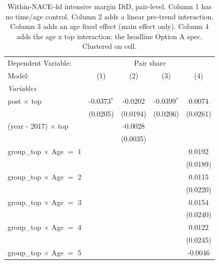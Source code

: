 
\begin{table}[htbp]
   \caption{\label{tab:phase4_within_intensive_did_agecontrol} Within-NACE-4d intensive margin DiD, pair-level. Column 1 has no time/age control. Column 2 adds a linear pre-trend interaction. Column 3 adds an age fixed effect (main effect only). Column 4 adds the age x top interaction: the headline Option A spec. Clustered on cell.}
   \centering
   \begin{tabular}{lcccc}
      \tabularnewline \midrule \midrule
      Dependent Variable: & \multicolumn{4}{c}{Pair share}\\
      Model:                           & (1)           & (2)      & (3)           & (4)\\  
      \midrule
      \emph{Variables}\\
      post $\times$ top                & -0.0373$^{*}$ & -0.0202  & -0.0399$^{*}$ & 0.0074\\   
                                       & (0.0205)      & (0.0194) & (0.0206)      & (0.0261)\\   
      (year - 2017) $\times$ top       &               & -0.0028  &               &   \\   
                                       &               & (0.0035) &               &   \\   
      group\_top $\times$ Age $=$ 1    &               &          &               & 0.0192\\   
                                       &               &          &               & (0.0189)\\   
      group\_top $\times$ Age $=$ 2    &               &          &               & 0.0115\\   
                                       &               &          &               & (0.0220)\\   
      group\_top $\times$ Age $=$ 3    &               &          &               & 0.0154\\   
                                       &               &          &               & (0.0240)\\   
      group\_top $\times$ Age $=$ 4    &               &          &               & 0.0122\\   
                                       &               &          &               & (0.0245)\\   
      group\_top $\times$ Age $=$ 5    &               &          &               & -0.0046\\   

\end{tabular}
\end{table}
